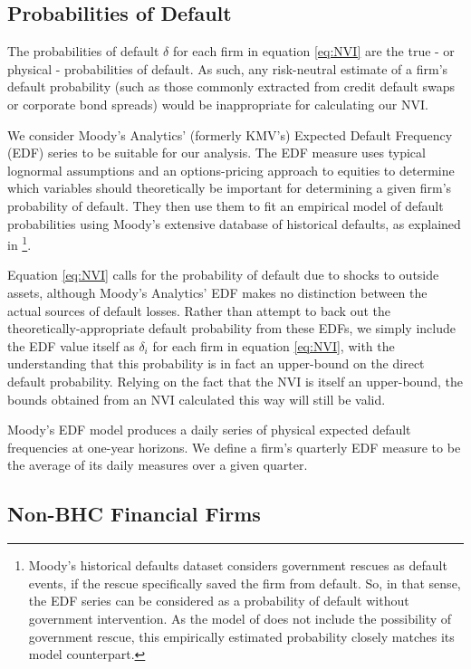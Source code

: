 \subsection{Probabilities of Default}

The probabilities of default $\delta$ for each firm in equation \ref{eq:NVI} are the true - or physical - probabilities of default. As such, any risk-neutral estimate of a firm's default probability (such as those commonly extracted from credit default swaps or corporate bond spreads) would be inappropriate for calculating our NVI.

We consider Moody's Analytics' (formerly KMV's) Expected Default Frequency (EDF) series to be suitable for our analysis. The EDF measure uses typical lognormal assumptions and an options-pricing approach to equities to determine which variables should theoretically be important for determining a given firm's probability of default. They then use them to fit an empirical model of default probabilities using Moody's extensive database of historical defaults, as explained in \citet{kmv_methods}\footnote{Moody's historical defaults dataset considers government rescues as default events, if the rescue specifically saved the firm from default. So, in that sense, the EDF series can be considered as a probability of default without government intervention. As the model of \citet{glasserman2015likely} does not include the possibility of government rescue, this empirically estimated probability closely matches its model counterpart.}.

Equation \ref{eq:NVI} calls for the probability of default due to shocks to outside assets, although Moody's Analytics' EDF makes no distinction between the actual sources of default losses. Rather than attempt to back out the theoretically-appropriate default probability from these EDFs, we simply include the EDF value itself as $\delta_i$ for each firm in equation \ref{eq:NVI}, with the understanding that this probability is in fact an upper-bound on the direct default probability. Relying on the fact that the NVI is itself an upper-bound, the bounds obtained from an NVI calculated this way will still be valid. 

Moody's EDF model produces a daily series of physical expected default frequencies at one-year horizons. We define a firm's quarterly EDF measure to be the average of its daily measures over a given quarter.

\subsection{Non-BHC Financial Firms} \label{subsec:non_bhc}

